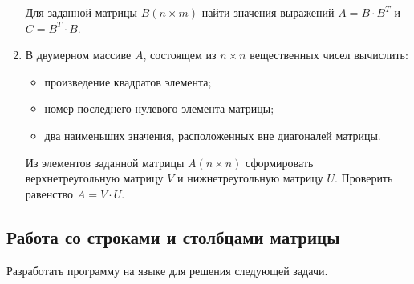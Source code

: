 \begin{enumerate}
Для заданной матрицы $B(n\times m)$ найти значения выражений  $A=B\cdot B^T$ и 
$C=B^T\cdot B$.
\item В двумерном массиве $A$, состоящем из $n\times n$ вещественных чисел
вычислить:

\begin{itemize}
\item произведение квадратов элемента;
\item номер последнего нулевого элемента матрицы;
\item два наименьших значения, расположенных вне диагоналей матрицы.
\end{itemize}

Из элементов заданной матрицы $A(n\times n)$ сформировать верхнетреугольную матрицу
$V$ и нижнетреугольную матрицу $U$. Проверить равенство  $A=V\cdot U$.
\end{enumerate}

\subsection[Работа со строками и столбцами матрицы]{Работа со строками и столбцами матрицы}
Разработать программу на языке  для решения следующей задачи.

